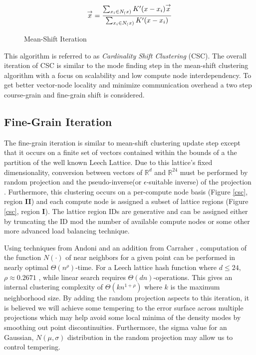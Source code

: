 \begin{figure}
\[
\overset{\rightarrow}{x}= {{\sum_{x_i\in N_(x)}
{K'({x-x_i})\overset{\rightarrow}{x}}}\over {\sum_{x_i\in N_(x)} {K'({x-x_i)}}
}}
\]
\caption{Mean-Shift Iteration \cite{Li09}}\label{unreferencedFigure}
\end{figure}

This algorithm is referred to as \emph{Cardinality Shift Clustering} (CSC).  The overall iteration of CSC is similar to
the mode finding step in the mean-shift clustering algorithm \cite{comaniciu-02, carreira, meanshift} with a
focus on scalability and low compute node interdependency.  To get better vector-node locality and minimize
communication overhead a two step course-grain and fine-grain shift is considered.

\subsection{Fine-Grain Iteration}

The fine-grain iteration is similar to mean-shift clustering update step except that it occurs on a finite set of
vectors contained within the bounds of a the partition of the well known Leech Lattice.  Due to this lattice's fixed
dimensionality, conversion between vectors of $\mathbb{R}^d$ and $\mathbb{R}^{24}$ must be performed by random
projection and the pseudo-inverse(or $\epsilon$-suitable inverse) of the projection \cite{bingham}.  Furthermore, this
clustering occurs on a per-compute node basis (Figure \ref{csc}, region \textbf{II}) and each compute node is assigned a
subset of lattice regions (Figure \ref{csc}, region \textbf{I}).  The lattice region IDs are generative and can be
assigned either by truncating the ID mod the number of available compute nodes or some other more advanced load
balancing technique.%

Using techniques from Andoni \cite{Andoni} and an addition from Carraher \cite{carraher2}, computation of the function
$N(\cdot)$ of near neighbors for a given point can be performed in nearly optimal $\Theta(n^\rho)$-time.  For a Leech
lattice hash function where $d \leq24$, $\rho \approx 0.2671 $ \cite{Andoni}, while linear search requires $\Theta(d
n)$-operations.  This gives an internal clustering complexity of $\Theta(k n^{1+\rho})$ where $k$ is the maximum
neighborhood size.  By adding the random projection aspects to this iteration, it is believed we will achieve some
tempering to the error surface across multiple projections which may help avoid some local minima of the density modes
by smoothing out point discontinuities.  Furthermore, the sigma value for an Gaussian, $N(\mu,\sigma)$ distribution in
the random projection may allow us to control tempering.

